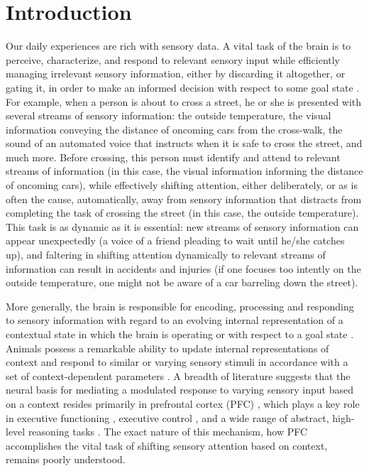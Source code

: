 \documentclass[12pt,a4paper,final]{iopart}
\begin{document}
\section{Introduction}
\label{sec:intro}
Our daily experiences are rich with sensory data. A vital task of the brain is to perceive, characterize, and respond to relevant sensory input while efficiently managing irrelevant sensory information, either by discarding it altogether, or gating it, in order to make an informed decision with respect to some goal state \cite{JDCohen:2001, Noudoost:2010}. For example, when a person is about to cross a street, he or she is presented with several streams of sensory information: the outside temperature, the visual information conveying the distance of oncoming cars from the cross-walk, the sound of an automated voice that instructs when it is safe to cross the street, and much more. Before crossing, this person must identify and attend to relevant streams of information (in this case, the visual information informing the distance of oncoming cars), while effectively shifting attention, either deliberately, or as is often the cause, automatically, away from sensory information that distracts from completing the task of crossing the street (in this case, the outside temperature). This task is as dynamic as it is essential: new streams of sensory information can appear unexpectedly (a voice of a friend pleading to wait until he/she catches up), and faltering in shifting attention dynamically to relevant streams of information can result in accidents and injuries (if one focuses too intently on the outside temperature, one might not be aware of a car barreling down the street).

More generally, the brain is responsible for encoding, processing and responding to sensory information with regard to an evolving internal representation of a contextual state in which the brain is operating or with respect to a goal state \cite{Desimon, JDCohen:2001}. Animals possess a remarkable ability to update internal representations of context and respond to similar or varying sensory stimuli in accordance with a set of context-dependent parameters \cite{Desimon}. A breadth of literature suggests that the neural basis for mediating a modulated response to varying sensory input based on a context resides primarily in prefrontal cortex (PFC) \cite{Desimon, Harvey, JDCohen:2001, Noudoost:2010, Tanji}, which plays a key role in executive functioning \cite{JDCohen:2001}, executive control \cite{Rossi}, and a wide range of abstract, high-level reasoning tasks \cite{Desimon, Drewe, Fletcher, Tanji}. The exact nature of this mechanism, how PFC accomplishes the vital task of shifting sensory attention based on context, remains poorly understood.
\end{document}
